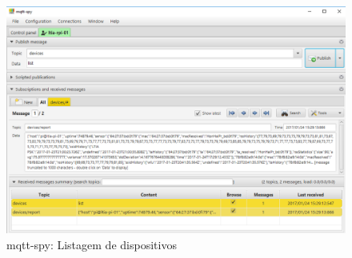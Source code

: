 \begin{figure}[htb]
	\centering
	\caption{\label{fig-mqtt-spy-list}mqtt-spy: Listagem de dispositivos}
	\includegraphics[width=1\textwidth]{052-gateway/mqtt/mqtt-spy-list.png}
\end{figure}
